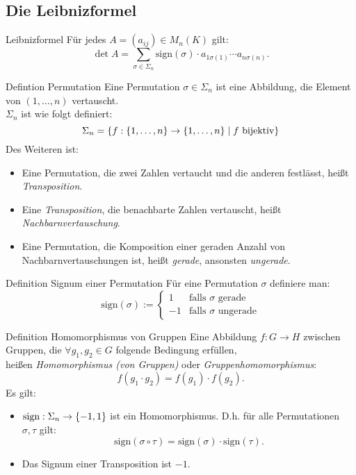 \documentclass[main.tex]{subfiles}
\begin{document}
\subsection*{Die Leibnizformel}

\begin{karte}{Leibnizformel}
    Für jedes \(A = (a_{ij}) \in M_n(K)\) gilt:
    \[\det A = \sum_{\sigma\in\Sigma_n} 
    \text{sign}(\sigma)\cdot a_{1\sigma(1)} \cdots a_{n\sigma(n)}. \]
\end{karte}
\begin{karte}{Defintion Permutation}
    Eine Permutation \(\sigma \in \Sigma_n\) ist eine Abbildung, die 
    Element von \((1, \ldots, n)\) vertauscht.\\
    \(\Sigma_n\) ist wie folgt definiert: 
    \[\Sigma_n = \{f: \{1, \ldots ,n\} \rightarrow \{1, \ldots ,n\} 
    \;\vert\; f \text{ bijektiv}\}\]
    Des Weiteren ist: 
    \begin{itemize}
        \item Eine Permutation, die zwei Zahlen vertaucht und die 
        anderen festlässt, heißt \textit{Transposition}.
        \item Eine \textit{Transposition}, die benachbarte Zahlen 
        vertauscht, heißt \textit{Nachbarnvertauschung}.
        \item Eine Permutation, die Komposition einer geraden Anzahl 
        von Nachbarnvertauschungen ist, heißt \textit{gerade}, 
        ansonsten \textit{ungerade}.
    \end{itemize}
\end{karte}
\begin{karte}{Definition Signum einer Permutation}
    Für eine Permutation \(\sigma\) definiere man: 
    \[ \text{sign}(\sigma) := \begin{cases}
        1 & \text{falls } \sigma \text{ gerade} \\
        -1 & \text{falls } \sigma \text{ ungerade}
    \end{cases} \]
\end{karte}
\begin{karte}{Definition Homomorphismus von Gruppen}
    Eine Abbildung \(f: G \rightarrow H\) zwischen Gruppen, die 
    \(\forall g_1,g_2 \in G\) folgende Bedingung erfüllen, \\
    heißen \textit{Homomorphismus (von Gruppen)} oder 
    \textit{Gruppenhomomorphismus}:
    \[f(g_1 \cdot g_2) = f(g_1) \cdot f(g_2).\]
    Es gilt: 
    \begin{itemize}
        \item \(\text{sign}: \Sigma_n \rightarrow \{-1,1\}\) 
        ist ein Homomorphismus.
        D.h. für alle Permutationen \(\sigma, \tau \) gilt:
        \[\text{sign}(\sigma \circ \tau) = \text{sign}(\sigma) 
        \cdot \text{sign}(\tau).\]
        \item Das Signum einer Transposition ist \(-1\).
    \end{itemize}
\end{karte}
\end{document}
